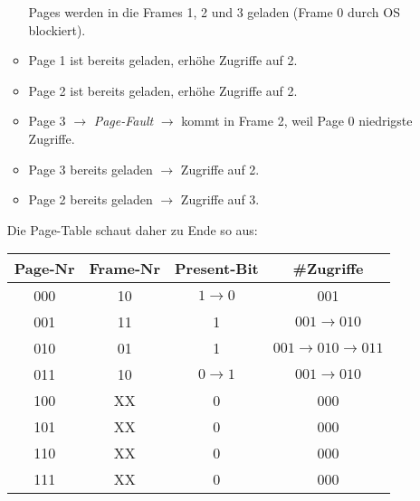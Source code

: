 \documentclass[a4paper, 12pt, margins=2cm]{homework}
\begin{document}
\begin{solution}
\begin{enumerate}[label=(\alph*)]
\begin{itemize}
                Pages werden in die Frames 1, 2 und 3 geladen (Frame 0 durch OS blockiert).
          \item Page 1 ist bereits geladen, erhöhe Zugriffe auf 2.
          \item Page 2 ist bereits geladen, erhöhe Zugriffe auf 2.
          \item Page 3 $\rightarrow$ \emph{Page-Fault} $\rightarrow$ kommt in Frame 2,
                weil Page 0 niedrigste Zugriffe.
          \item Page 3 bereits geladen $\rightarrow$ Zugriffe auf 2.
          \item Page 2 bereits geladen $\rightarrow$ Zugriffe auf 3.
        \end{itemize}

        Die Page-Table schaut daher zu Ende so aus:
        \begin{center}
          \begin{tabular}{|c|c|c|c|}
            \hline
            Page-Nr & Frame-Nr & Present-Bit      & \#Zugriffe                        \\ \hline \hline
            000     & 10       & $1\rightarrow 0$ & 001                               \\ \hline
            001     & 11       & 1                & $001\rightarrow 010$              \\ \hline
            010     & 01       & 1                & $001\rightarrow 010\rightarrow 011$ \\ \hline
            011     & 10       & $0\rightarrow 1$ & $001\rightarrow 010$              \\ \hline
            100     & XX       & 0                & 000                               \\ \hline
            101     & XX       & 0                & 000                               \\ \hline
            110     & XX       & 0                & 000                               \\ \hline
            111     & XX       & 0                & 000                               \\ \hline
          \end{tabular}
        \end{center}
  \end{enumerate}  
\end{solution}
\end{document}
